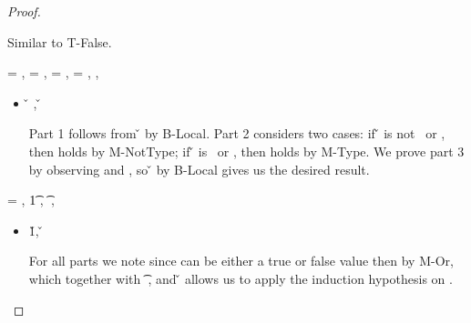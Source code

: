 \begin{lemma}
\begin{proof}
\begin{case}[T-Nil]
\begin{itemize}
\begin{subcase}[B-Val]
      Similar to T-False.
\end{subcase}

\end{itemize}

\end{case}

\begin{case}[T-Local]
  \e{} = \x{}, \thenprop{\prop{}} = {\notprop {\falsy{}} {\x{}}},
  \elseprop{\prop{}} = {\isprop {\falsy{}} {\x{}}},
\object{} = \x{}, 
\inpropenv{\propenv{}}{\isprop{\t{}}{\x{}}},

\begin{itemize}
  \item[]
\begin{subcase}[B-Local]
{ \inopenv {\openv{}} {\x{}} {\v{}} },
{ \opsem {\openv{}} {\x{}} {\v{}} }

Part 1 follows from \inopenv{\openv{}}{\x{}} {\v{}} by B-Local.
Part 2 considers two cases: if \v{} is not \false\ or \nil, then 
\satisfies{\openv{}}{\notprop{\falsy}{\x{}}} holds by M-NotType; if \v{} is \false\ or \nil, then 
\satisfies{\openv{}}{\isprop{\falsy}{\x{}}} holds by M-Type.
We prove part 3 by observing
\inpropenv{\propenv{}}{\isprop{\t{}}{\x{}}}
and
\satisfies{\openv{}}{\propenv{}},
so
{ \inopenv {\openv{}} {\x{}} {\v{}} }
by B-Local
gives us the desired result.
\end{subcase}
\end{itemize}

\end{case}

\begin{case}[T-Do]
\e{} = { {}},
  \judgement {\propenv{}} 
             { {\t1}} 
             { {}} 
             {},
           { {\t{}}} 
           {\filterset {\thenprop {\prop{}}} {\elseprop {\prop{}}}} 
           {\object{}},

\begin{itemize}
  \item[] \begin{subcase}[B-Do]
  \opsem {\openv{}} {} {\v{1}},
  \opsem {\openv{}} {} {\v{}}

For all parts we note 
    since {} can be either a true or false value
    then
    {}
    by M-Or,
    which together with 
           { {\t{}}} 
           {\filterset {\thenprop {\prop{}}} {\elseprop {\prop{}}}} 
           {\object{}},
    and
  \opsem {\openv{}} {} {\v{}}
    allows us to apply the induction hypothesis on .


\end{subcase}
\end{itemize}
\end{case}
\end{proof}
\end{lemma}
